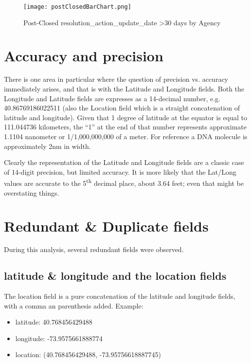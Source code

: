 \documentclass[12pt, titlepage]{article}
\begin{document}
	\begin{figure}[H]
		 \centering
		 \texttt{[image: postClosedBarChart.png]}
		 \caption{Post-Closed resolution\_action\_update\_date >30 days by Agency }
		 \label{fig:resolution-by-agency}
	\end{figure}		

\section{Accuracy and precision}\label{sec:precision}
There is one area in particular where the question of precision vs. accuracy immediately arises, and that is with the Latitude and Longitude fields.  Both the 
Longitude and Latitude fields are expresses as a 14-decimal number, e.g. 40.86769186022511 (also the Location field which is a straight concatenation of
latitude and longitude). Given that 1 degree of latitude at the equator is equal to 111.044736 kilometers, the ``1'' at the end of that number represents
approximate 1.1104 nanometer or 1/1,000,000,000 of a meter. For reference a DNA molecule is approximately 2nm in width. 

Clearly the representation of the Latitude and Longitude fields are a classic case of 14-digit precision, 
but limited accuracy. It is more likely that the Lat/Long values are accurate to the 5\textsuperscript{th} decimal place, about 3.64 feet; even that might be
overstating things. 



\section{Redundant \& Duplicate fields}\label{sec:duplicates}
During this analysis, several redundant fields were observed.

\subsection{latitude \& longitude and the location fields}  The location field is a pure concatenation of the latitude and longitude fields, 
with a comma an parenthesis added. Example:  

	\begin{itemize}
		\item  latitude: 40.768456429488
		\item  longitude: -73.9575661888774
		\item  location: (40.768456429488, -73.95756618887745)
	\end{itemize}
\end{document}

